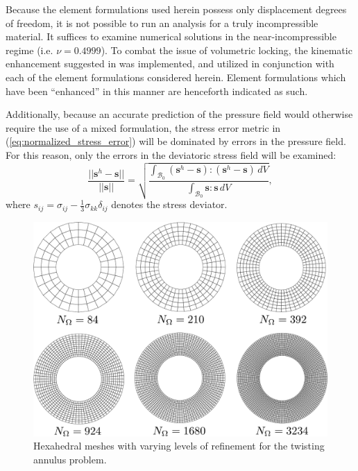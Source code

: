 Because the element formulations used herein possess only displacement degrees of freedom, it is not possible to run an analysis for a truly incompressible material. It suffices to examine numerical solutions in the near-incompressible regime (i.e. $\nu = 0.4999$). To combat the issue of volumetric locking, the kinematic enhancement suggested in \cite{Rashid:06} was implemented, and utilized in conjunction with each of the element formulations considered herein. Element formulations which have been ``enhanced'' in this manner are henceforth indicated as such.

Additionally, because an accurate prediction of the pressure field would otherwise require the use of a mixed formulation, the stress error metric in (\ref{eq:normalized_stress_error}) will be dominated by errors in the pressure field. For this reason, only the errors in the deviatoric stress field will be examined:
\begin{equation}
	\frac{||\mathbf{s}^h - \mathbf{s}||}{||\mathbf{s}||} = \sqrt{\frac{\int_{\mathcal{B}_0} (\mathbf{s}^h - \mathbf{s}) \colon (\mathbf{s}^h - \mathbf{s}) \, dV}{\int_{\mathcal{B}_0} \mathbf{s} \colon \mathbf{s} \, dV}},
	\label{eq:deviator_stress_error}
\end{equation}
where $s_{ij} = \sigma_{ij} - \frac{1}{3} \sigma_{kk} \delta_{ij}$ denotes the stress deviator.

\begin{figure}[!h]
  \centering
  \includegraphics[width=5.0in]{figures/hex_annulus_meshes.pdf}
  \caption{Hexahedral meshes with varying levels of refinement for the twisting annulus problem.}
  \label{fig:hex_annulus_meshes}
\end{figure}

